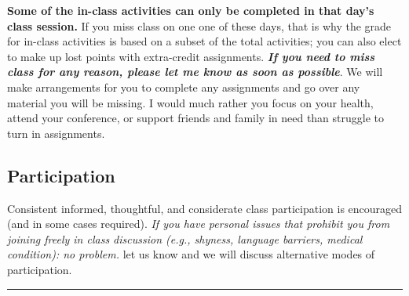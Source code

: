 \documentclass[
  10pt,
  letterpaper,
  oneside,
  open=any]{scrbook}
\begin{document}
\textbf{Some of the in-class activities can only be completed in that
day's class session.} If you miss class on one one of these days, that
is why the grade for in-class activities is based on a subset of the
total activities; you can also elect to make up lost points with
extra-credit assignments. \textbf{\emph{If you need to miss class for
any reason, please let me know as soon as possible}}. We will make
arrangements for you to complete any assignments and go over any
material you will be missing. I would much rather you focus on your
health, attend your conference, or support friends and family in need
than struggle to turn in assignments.

\subsection*{Participation}\label{participation}

Consistent informed, thoughtful, and considerate class participation is
encouraged (and in some cases required). \emph{If you have personal
issues that prohibit you from joining freely in class discussion (e.g.,
shyness, language barriers, medical condition): no problem.} let us know
and we will discuss alternative modes of participation.

\begin{center}\rule{0.5\linewidth}{0.5pt}\end{center}


\backmatter
\end{document}
